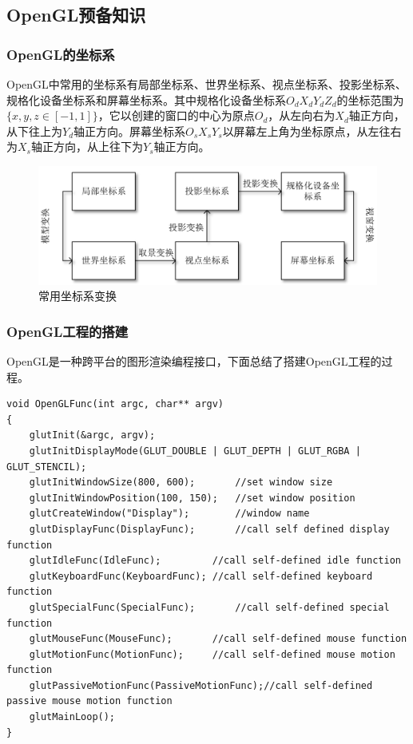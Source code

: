 \documentclass[10pt]{article}
\begin{document}
\subsection{OpenGL预备知识}
\subsubsection{OpenGL的坐标系}
OpenGL中常用的坐标系有局部坐标系、世界坐标系、视点坐标系、投影坐标系、规格化设备坐标系和屏幕坐标系。其中规格化设备坐标系$O_dX_dY_dZ_d$的坐标范围为$\{x,y,z \in [-1,1]\}$，它以创建的窗口的中心为原点$O_d$，从左向右为$X_d$轴正方向，从下往上为$Y_d$轴正方向。屏幕坐标系$O_sX_sY_s$以屏幕左上角为坐标原点，从左往右为$X_s$轴正方向，从上往下为$Y_s$轴正方向。
\begin{figure}[H]
\begin{center}
\includegraphics[scale=0.5]{coordinate.png}
\caption{常用坐标系变换}
\end{center}
\end{figure}


\subsubsection{OpenGL工程的搭建}
OpenGL是一种跨平台的图形渲染编程接口，下面总结了搭建OpenGL工程的过程。
\begin{lstlisting}
void OpenGLFunc(int argc, char** argv)
{
	glutInit(&argc, argv);
	glutInitDisplayMode(GLUT_DOUBLE | GLUT_DEPTH | GLUT_RGBA | GLUT_STENCIL);
	glutInitWindowSize(800, 600);		//set window size
	glutInitWindowPosition(100, 150);	//set window position
	glutCreateWindow("Display");		//window name
	glutDisplayFunc(DisplayFunc);		//call self defined display function
	glutIdleFunc(IdleFunc);			//call self-defined idle function
	glutKeyboardFunc(KeyboardFunc);	//call self-defined keyboard function
	glutSpecialFunc(SpecialFunc);		//call self-defined special function
	glutMouseFunc(MouseFunc);		//call self-defined mouse function
	glutMotionFunc(MotionFunc);		//call self-defined mouse motion function
	glutPassiveMotionFunc(PassiveMotionFunc);//call self-defined passive mouse motion function
	glutMainLoop();
}
\end{lstlisting}
\end{document}

